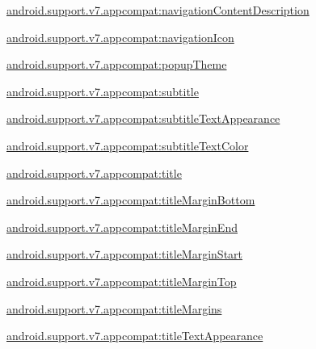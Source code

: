 {\ttfamily \hyperlink{classandroid_1_1support_1_1v7_1_1appcompat_1_1R_1_1styleable_a61b517f99cb13ca2690103136bdab8b5}{android.\+support.\+v7.\+appcompat\+:navigation\+Content\+Description}}

{\ttfamily \hyperlink{classandroid_1_1support_1_1v7_1_1appcompat_1_1R_1_1styleable_ab88a1ca69cc3dbb4e5ffdadec5f6288a}{android.\+support.\+v7.\+appcompat\+:navigation\+Icon}}

{\ttfamily \hyperlink{classandroid_1_1support_1_1v7_1_1appcompat_1_1R_1_1styleable_aa37388b9b7ea40ceaabc9534f732ee00}{android.\+support.\+v7.\+appcompat\+:popup\+Theme}}

{\ttfamily \hyperlink{classandroid_1_1support_1_1v7_1_1appcompat_1_1R_1_1styleable_a2cbf4193bb5275277f1f000819d09790}{android.\+support.\+v7.\+appcompat\+:subtitle}}

{\ttfamily \hyperlink{classandroid_1_1support_1_1v7_1_1appcompat_1_1R_1_1styleable_ad4f03da4f62ec7ae8eb42d3aafb404ef}{android.\+support.\+v7.\+appcompat\+:subtitle\+Text\+Appearance}}

{\ttfamily \hyperlink{classandroid_1_1support_1_1v7_1_1appcompat_1_1R_1_1styleable_a0d191ed721e0d27dabbefa262648c353}{android.\+support.\+v7.\+appcompat\+:subtitle\+Text\+Color}}

{\ttfamily \hyperlink{classandroid_1_1support_1_1v7_1_1appcompat_1_1R_1_1styleable_ae82c877334b3ecc680d267e91832e912}{android.\+support.\+v7.\+appcompat\+:title}}

{\ttfamily \hyperlink{classandroid_1_1support_1_1v7_1_1appcompat_1_1R_1_1styleable_a9412dd4f8671bfd3fbc475b6bb4b9686}{android.\+support.\+v7.\+appcompat\+:title\+Margin\+Bottom}}

{\ttfamily \hyperlink{classandroid_1_1support_1_1v7_1_1appcompat_1_1R_1_1styleable_a141a5fe7ad67958248bcacd6a5f7043d}{android.\+support.\+v7.\+appcompat\+:title\+Margin\+End}}

{\ttfamily \hyperlink{classandroid_1_1support_1_1v7_1_1appcompat_1_1R_1_1styleable_aa1690beeeb06a36f3c4d56b00ea8777d}{android.\+support.\+v7.\+appcompat\+:title\+Margin\+Start}}

{\ttfamily \hyperlink{classandroid_1_1support_1_1v7_1_1appcompat_1_1R_1_1styleable_a321e1d73a518a11499a1757e88716f30}{android.\+support.\+v7.\+appcompat\+:title\+Margin\+Top}}

{\ttfamily \hyperlink{classandroid_1_1support_1_1v7_1_1appcompat_1_1R_1_1styleable_aeae44f37b9e7934071b303e4412587c2}{android.\+support.\+v7.\+appcompat\+:title\+Margins}}

{\ttfamily \hyperlink{classandroid_1_1support_1_1v7_1_1appcompat_1_1R_1_1styleable_a95960040ba30a96fcd381c8f67ec461d}{android.\+support.\+v7.\+appcompat\+:title\+Text\+Appearance}}

